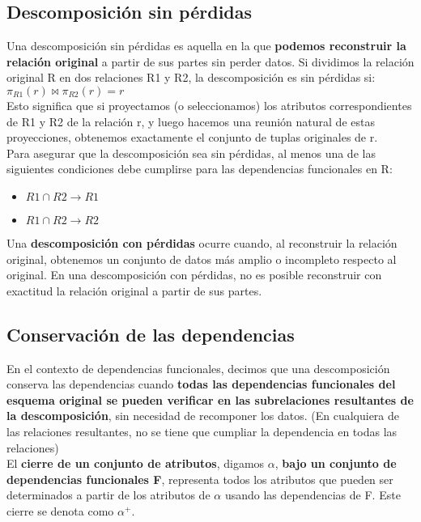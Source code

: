 \documentclass{article}
\begin{document}
\subsection{Descomposición sin pérdidas}
Una descomposición sin pérdidas es aquella en la que \textbf{podemos reconstruir la relación original} a partir de sus partes sin perder datos. Si dividimos la relación original R en dos relaciones R1 y R2, la descomposición es sin pérdidas si: $\pi_{R1}(r) \bowtie \pi_{R2}(r) = r$ \\
Esto significa que si proyectamos (o seleccionamos) los atributos correspondientes de R1 y R2 de la relación r, y luego hacemos una reunión natural de estas proyecciones, obtenemos exactamente el conjunto de tuplas originales de r. \\
Para asegurar que la descomposición sea sin pérdidas, al menos una de las siguientes condiciones debe cumplirse para las dependencias funcionales en R:
\begin{itemize}
    \item $R1 \cap R2 \rightarrow R1$
    \item $R1 \cap R2 \rightarrow R2$
\end{itemize}

Una \textbf{descomposición con pérdidas} ocurre cuando, al reconstruir la relación original, obtenemos un conjunto de datos más amplio o incompleto respecto al original. En una descomposición con pérdidas, no es posible reconstruir con exactitud la relación original a partir de sus partes.

\newpage

\subsection{Conservación de las dependencias}
En el contexto de dependencias funcionales, decimos que una descomposición conserva las dependencias cuando \textbf{todas las dependencias funcionales del esquema original se pueden verificar en las subrelaciones resultantes de la descomposición}, sin necesidad de recomponer los datos. (En cualquiera de las relaciones resultantes, no se tiene que cumpliar la dependencia en todas las relaciones) \\

El \textbf{cierre de un conjunto de atributos}, digamos $\alpha$, \textbf{bajo un conjunto de dependencias funcionales F}, representa todos los atributos que pueden ser determinados a partir de los atributos de $\alpha$ usando las dependencias de F. Este cierre se denota como $\alpha^+$. \\
\end{document}
